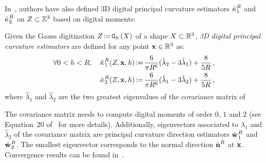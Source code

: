 \documentclass{llncs}
\begin{document}
In~\cite{CVIU2014}, authors have also defined 3D digital principal curvature
estimators $\hat{\kappa_{}}_{1}^{R}$ and $\hat{\kappa_{}}_{2}^{R}$ on $Z\subset{\mathbb{Z}}^3$ based
on digital moments:
%
\begin{Definition}
  Given the Gauss digitization $Z \!\mathrel{\mathop:}=\! \mathtt{G}_{h}\left(X\right)$ of a shape $X \subset {\mathbb{R}}^3$,
  \emph{3D digital principal curvature estimators} are defined for any point $\mathbf{x}
  \in {\mathbb{R}}^3$ as:
  \begin{align}
    \forall 0 < h < R,\quad
    \hat{\kappa_{}}_{1}^{R}(Z,\mathbf{x},h) &\!\mathrel{\mathop:}=\! \frac{6}{\pi {R}^6}(\hat{\lambda}_2 - 3\hat{\lambda}_1) + \frac{8}{5 R} \,,\label{eq:dig-curvature-estimator-k1}\\
    \hat{\kappa_{}}_{2}^{R}(Z,\mathbf{x},h) &\!\mathrel{\mathop:}=\! \frac{6}{\pi {R}^6}(\hat{\lambda}_1 - 3\hat{\lambda}_2) + \frac{8}{5 R} \,,
    \label{eq:dig-curvature-estimator-k2}
  \end{align}
  where $\hat{\lambda}_1$ and $\hat{\lambda}_2$ are the two greatest eigenvalues
  of the covariance matrix of 
\end{Definition}
%
The covariance matrix needs to compute digital moments of order $0$, $1$
and $2$ (see Equation~20 of~\cite{CVIU2014} for more details).
Additionally, eigenvectors associated to $\hat{\lambda}_1$ and
$\hat{\lambda}_2$ of the covariance matrix are principal
curvature direction estimators $\hat{\mathbf{w}_{}}_{1}^{R}$ and
$\hat{\mathbf{w}_{}}_{2}^{R}$. The smallest eigenvector corresponds to the normal
direction $\hat{\mathbf{n}{}}^{R}$ at $\mathbf{x}$. Convergence results can be found
in~\cite{ChapterIICurvature}.
\end{document}
